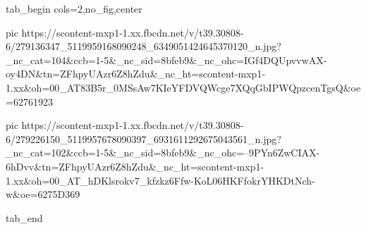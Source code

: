  
 
 
 
 

\ifcmt
  tab_begin cols=2,no_fig,center

     pic https://scontent-mxp1-1.xx.fbcdn.net/v/t39.30808-6/279136347_5119959168090248_6349051424645370120_n.jpg?_nc_cat=104&ccb=1-5&_nc_sid=8bfeb9&_nc_ohc=IGf4DQUpvvwAX-oy4DN&tn=ZFhpyUAzr6Z8hZdu&_nc_ht=scontent-mxp1-1.xx&oh=00_AT83B5r_0MSsAw7KIeYFDVQWcge7XQqGbIPWQpzcenTgsQ&oe=62761923

     pic https://scontent-mxp1-1.xx.fbcdn.net/v/t39.30808-6/279226150_5119957678090397_6931611292675043561_n.jpg?_nc_cat=102&ccb=1-5&_nc_sid=8bfeb9&_nc_ohc=--9PYn6ZwCIAX-6hDvv&tn=ZFhpyUAzr6Z8hZdu&_nc_ht=scontent-mxp1-1.xx&oh=00_AT_hDKlsrokv7_kfzkz6Ffw-KoL06HKFfokrYHKDtNch-w&oe=6275D369

  tab_end
\fi
